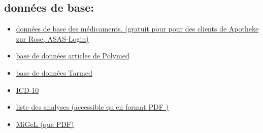 \subsection{données de base:}
\begin{itemize}
 \item \href{http://cug.zur-rose.ch/aerztegrossist/aerztegrossist.asp}{données de base des médicaments. (gratuit pour pour des clients de Apotheke zur Rose,  ASAS-Login)}
\item \href{http://www.polymed.ch/d/aktuell/downloads.html}{base de données articles de Polymed}
\item \href{http://www.tarmedsuisse.ch/fileadmin/media/Dateien/Browser/TARMED_Database_1.03.zip}{base de données Tarmed}
\item \href{http://www.dimdi.de/dynamic/de/klassi/downloadcenter/icd-10-gm/version2006/systematik/x1gea2006.zip}{ICD-10}
\item \href{http://www.famh.ch/liste_analyses_d_06.pdf}{liste des analyses (accessible qu'en format PDF )}
\item \href{http://www.bag.admin.ch/themen/krankenversicherung/02874/index.html?lang=de&download=M3wBUQCu/8ulmKDu36WenojQ1NTTjaXZnqWfVpzLhmfhnapmmc7Zi6rZnqCkkIV6e3l9bKbXrZ2lhtTN34al3p6YrY7P1oah162apo3X1cjYh2+hoJVn6w==}{MiGeL (que PDF)}
\end{itemize}

